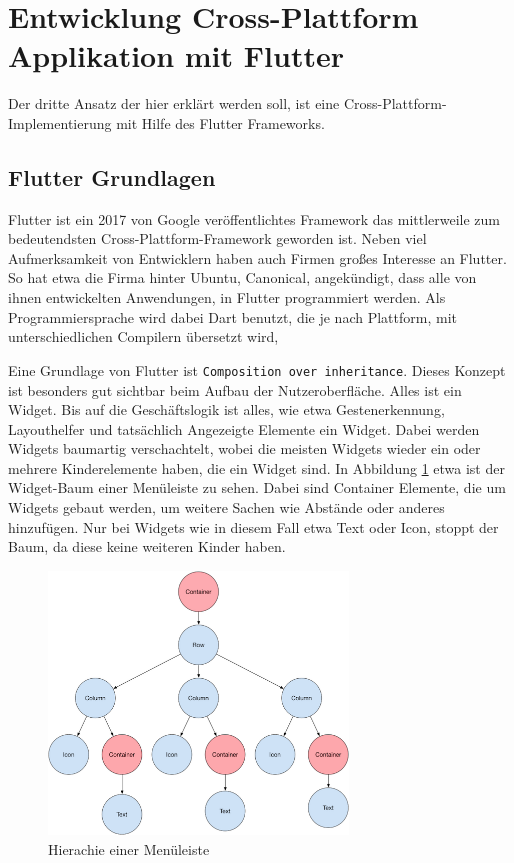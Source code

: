 \section{Entwicklung Cross-Plattform Applikation mit Flutter}
Der dritte Ansatz der hier erklärt werden soll, ist eine Cross-Plattform-Implementierung mit Hilfe des Flutter Frameworks.

\subsection{Flutter Grundlagen}
Flutter ist ein 2017 von Google veröffentlichtes Framework das mittlerweile zum bedeutendsten Cross-Plattform-Framework geworden ist\cite{statist_CP_Framework}. Neben viel Aufmerksamkeit von Entwicklern haben auch Firmen großes Interesse an Flutter. So hat etwa die Firma hinter Ubuntu, Canonical, angekündigt, dass alle von ihnen entwickelten Anwendungen, in Flutter programmiert werden\cite{Ubuntu_Flutter}. Als Programmiersprache wird dabei Dart benutzt, die je nach Plattform, mit unterschiedlichen Compilern übersetzt wird,

Eine Grundlage von Flutter ist \verb|Composition over inheritance|. Dieses Konzept ist besonders gut sichtbar beim Aufbau der Nutzeroberfläche. Alles ist ein Widget. Bis auf die Geschäftslogik ist alles, wie etwa Gestenerkennung, Layouthelfer und tatsächlich Angezeigte Elemente ein Widget\cite{Thiele_2018}. Dabei werden Widgets baumartig verschachtelt, wobei die meisten Widgets wieder ein oder mehrere Kinderelemente haben, die ein Widget sind. In Abbildung \ref{fig:flutter_layout_tree} etwa ist der Widget-Baum einer Menüleiste zu sehen. Dabei sind Container Elemente, die um Widgets gebaut werden, um weitere Sachen wie Abstände oder anderes hinzufügen. Nur bei Widgets wie in diesem Fall etwa Text oder Icon, stoppt der Baum, da diese keine weiteren Kinder haben.

\begin{figure}[ht]
  \centering
  \includegraphics[height=7cm,keepaspectratio]{images/sample-flutter-layout.png} 
  \caption[Hierachie einer Menüleiste]{Hierachie einer Menüleiste\protect\footnotemark}
  \label{fig:flutter_layout_tree}
\end{figure}

